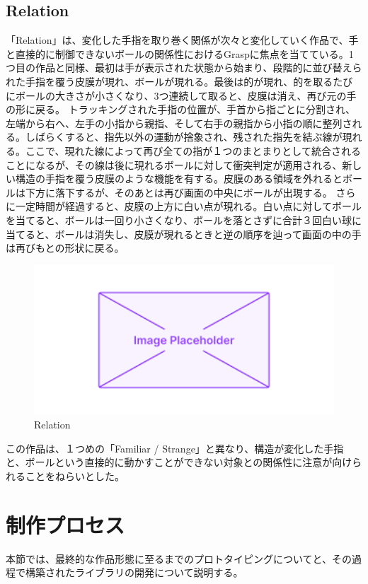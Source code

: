 \subsection*{Relation}
「Relation」は、変化した手指を取り巻く関係が次々と変化していく作品で、手と直接的に制御できないボールの関係性におけるGraspに焦点を当てている。1つ目の作品と同様、最初は手が表示された状態から始まり、段階的に並び替えられた手指を覆う皮膜が現れ、ボールが現れる。最後は的が現れ、的を取るたびにボールの大きさが小さくなり、3つ連続して取ると、皮膜は消え、再び元の手の形に戻る。
トラッキングされた手指の位置が、手首から指ごとに分割され、左端から右へ、左手の小指から親指、そして右手の親指から小指の順に整列される。しばらくすると、指先以外の運動が捨象され、残された指先を結ぶ線が現れる。ここで、現れた線によって再び全ての指が１つのまとまりとして統合されることになるが、その線は後に現れるボールに対して衝突判定が適用される、新しい構造の手指を覆う皮膜のような機能を有する。皮膜のある領域を外れるとボールは下方に落下するが、そのあとは再び画面の中央にボールが出現する。
さらに一定時間が経過すると、皮膜の上方に白い点が現れる。白い点に対してボールを当てると、ボールは一回り小さくなり、ボールを落とさずに合計３回白い球に当てると、ボールは消失し、皮膜が現れるときと逆の順序を辿って画面の中の手は再びもとの形状に戻る。
\begin{figure}[H]
  \centering
  \includegraphics[width=15cm]{img/placeholder.png}
  \caption{Relation}
  \label{fig:relation}
\end{figure}

この作品は、１つめの「Familiar / Strange」と異なり、構造が変化した手指と、ボールという直接的に動かすことができない対象との関係性に注意が向けられることをねらいとした。



\section{制作プロセス}
本節では、最終的な作品形態に至るまでのプロトタイピングについてと、その過程で構築されたライブラリの開発について説明する。
